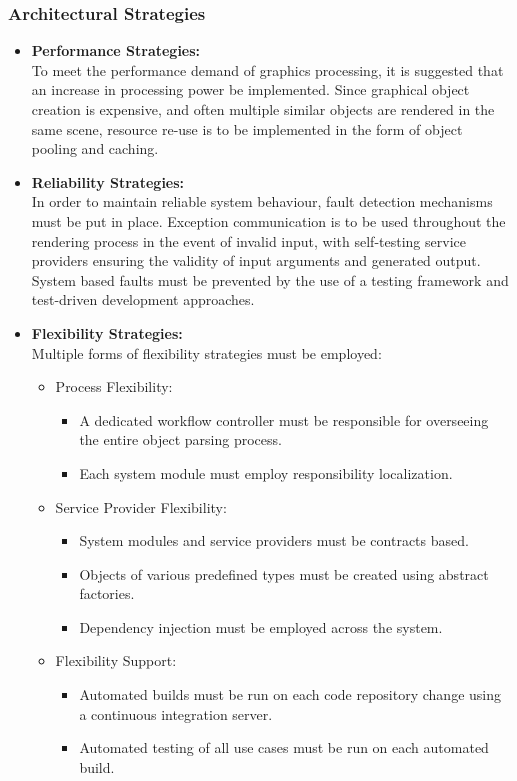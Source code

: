 \documentclass[a4paper,12pt]{article}
\begin{document}
	\subsubsection{Architectural Strategies}
		
		\begin{itemize}
			\item \textbf{Performance Strategies:}\\
				To meet the performance demand of graphics processing, it is suggested that an increase in processing power be implemented. Since graphical object creation is expensive, and often multiple similar objects are rendered in the same scene, resource re-use is to be implemented in the form of object pooling and caching.
			\item \textbf{Reliability Strategies:}\\
				In order to maintain reliable system behaviour, fault detection mechanisms must be put in place. Exception communication is to be used throughout the rendering process in the event of invalid input, with self-testing service providers ensuring the validity of input arguments and generated output. System based faults must be prevented by the use of a testing framework and test-driven development approaches.
			\item \textbf{Flexibility Strategies:}\\
				Multiple forms of flexibility strategies must be employed:
				
				\begin{itemize}
					\item Process Flexibility:
						\begin{itemize}
							\item A dedicated workflow controller must be responsible for overseeing the entire object parsing process.
							\item Each system module must employ responsibility localization.
						\end{itemize}
					\item Service Provider Flexibility:
						\begin{itemize}
							\item System modules and service providers must be contracts based.
							\item Objects of various predefined types must be created using abstract factories.
							\item Dependency injection must be employed across the system.
						\end{itemize}
					\item Flexibility Support:
						\begin{itemize}
							\item Automated builds must be run on each code repository change using a continuous integration server.
							\item Automated testing of all use cases must be run on each automated build.
						\end{itemize}
				\end{itemize}
		\end{itemize}
\end{document}
